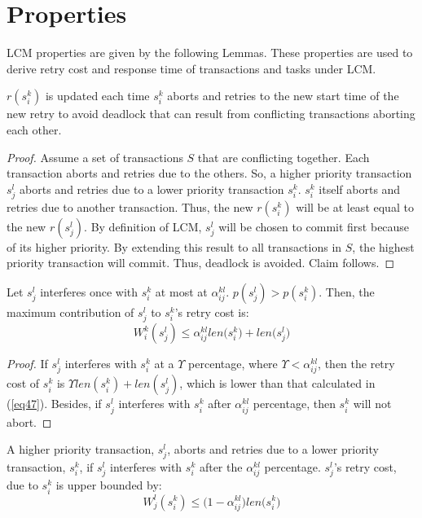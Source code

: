 \section{Properties}\label{sec:lcm_properties}
%
LCM properties are given by the following Lemmas. These properties are used to derive retry cost and response time of transactions and tasks under LCM.
%
\begin{clm}\label{clm:lcm_deadlock_avoid}
%
$r\left(s_i^k\right)$ is updated each time $s_i^k$ aborts and retries to the new start time of the new retry to avoid deadlock that can result from conflicting transactions aborting each other.
%
\end{clm}
%
\begin{proof}
%
Assume a set of transactions $S$ that are conflicting together. Each transaction aborts and retries due to the others. So, a higher priority transaction $s_j^l$ aborts and retries due to a lower priority transaction $s_i^k$. $s_i^k$ itself aborts and retries due to another transaction. Thus, the new $r\left(s_i^k\right)$ will be at least equal to the new $r\left(s_j^l\right)$. By definition of LCM, $s_j^l$ will be chosen to commit first because of its higher priority. By extending this result to all transactions in $S$, the highest priority transaction will commit. Thus, deadlock is avoided. Claim follows.
%
\end{proof}
%
\begin{clm}\label{LCM_higher_rc}
%
Let $s_{j}^{l}$ interferes once with $s_{i}^{k}$ at most at $\alpha_{ij}^{kl}$. $p\left(s_j^l\right) > p\left(s_i^k\right)$. Then, the maximum contribution of $s_{j}^{l}$ to 
$s_{i}^{k}$'s retry cost is:
\begin{equation}
W_i^k(s_j^l)\le \alpha_{ij}^{kl}len\Big(s_{i}^{k}\Big)+len\Big(s_{j}^{l}\Big)\label{eq47}\end{equation}
%
\end{clm}
%
\begin{proof}\normalfont
%
If $s_{j}^{l}$ interferes with $s_{i}^{k}$ at a $\Upsilon$ percentage, where $\Upsilon<\alpha_{ij}^{kl}$,
then the retry cost of $s_{i}^{k}$ is $\Upsilon len(s_{i}^{k})+len(s_{j}^{l})$, which is lower than that calculated in (\ref{eq47}). Besides, 
if $s_{j}^{l}$ interferes with $s_{i}^{k}$ after
$\alpha_{ij}^{kl}$ percentage, then $s_{i}^{k}$ will not
abort.
%
\end{proof}
%
\begin{clm}\label{LCM_lower_rc}
%
A higher priority transaction, $s_j^l$, aborts and retries due to a lower priority transaction, $s_i^k$, if $s_{j}^{l}$ interferes with $s_{i}^{k}$ after the $\alpha_{ij}^{kl}$ percentage. $s_j^l$'s retry cost, due to $s_{i}^{k}$ is upper bounded by:
%
\begin{equation}
W_j^l(s_i^k)\le \Big(1-\alpha_{ij}^{kl}\Big)len\Big(s_{i}^{k}\Big)
\label{eq48}
\end{equation}
%
\end{clm}
